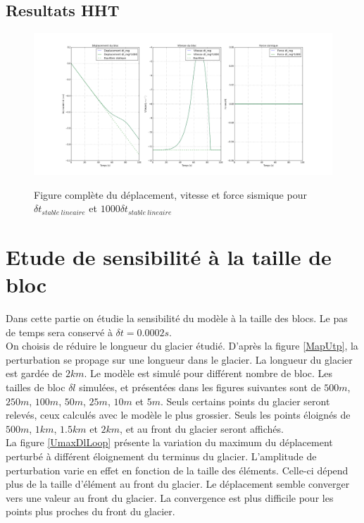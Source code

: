 \documentclass[11pt, a4paper]{article}
\begin{document}
\subsection{Resultats HHT}
\begin{figure}[h!]
	\centering
	\includegraphics[width=1\linewidth]{figures/Part3/Subpart5/DeplaVitesFsisSubplotStable.png}
	\label{SubplotDeplaVitesFsisStableHHT}
	\caption{Figure complète du déplacement, vitesse et force sismique pour $\delta t_{stable \ lineaire}$ et $1000 \delta t_{stable \ lineaire}$}
\end{figure}

\section{Etude de sensibilité à la taille de bloc}
Dans cette partie on étudie la sensibilité du modèle à la taille des blocs. Le pas de temps sera conservé à $\delta t = 0.0002s$.
\\

On choisis de réduire le longueur du glacier étudié. D'après la figure \ref{MapUtp}, la perturbation se propage sur une longueur dans le glacier. La longueur du glacier est gardée de $2km$. Le modèle est simulé pour différent nombre de bloc. Les tailles de bloc $\delta l$ simulées, et présentées dans les figures suivantes sont de $500m$, $250m$, $100m$, $50m$, $25m$, $10m$ et $5m$. Seuls certains points du glacier seront relevés, ceux calculés avec le modèle le plus grossier. Seuls les points éloignés de $500m$, $1km$, $1.5km$ et $2km$, et au front du glacier seront affichés.
\\

La figure \ref{UmaxDlLoop} présente la variation du maximum du déplacement perturbé à différent éloignement du terminus du glacier. L'amplitude de perturbation varie en effet en fonction de la taille des éléments. Celle-ci dépend plus de la taille d'élément au front du glacier. Le déplacement semble converger vers une valeur au front du glacier. La convergence est plus difficile pour les points plus proches du front du glacier.
\\
\end{document}
